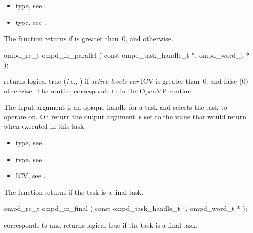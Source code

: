 \crossreferences
\begin{itemize}
	\item {} type, see .
	\item {} type, see .
\end{itemize}


\label{ompd:ompd_in_parallel}
\summary
The  function returns  if  is greater than~0, and  otherwise.

\format
\cspecificstart
\begin{ompSyntax}
ompd_rc_t ompd_in_parallel (
  const ompd_task_handle_t *,
  ompd_word_t *
);
\end{ompSyntax}
\cspecificend

\descr
{} returns logical true (\textit{i.e.}, )
if \emph{active-levels-var}
ICV is greater than~0, and false (0) otherwise.
The routine corresponds to  in the OpenMP runtime.

\argdesc
The input argument  is an opaque handle for a task and selects the task to operate on.
On return the output argument  is set to the value that  would return when
executed in this task.

\crossreferences
\begin{itemize}
	\item {} type, see .
	\item {} type, see .
	\item {} ICV, see .
\end{itemize}


\label{ompd:ompd_in_final}
\summary
The  function returns  if the task is a final task.

\format
\cspecificstart
\begin{ompSyntax}
ompd_rc_t ompd_in_final (
  const ompd_task_handle_t *,
  ompd_word_t *
);
\end{ompSyntax}
\cspecificend

\descr
{} corresponds to  and returns
logical true if the task is a final task.


